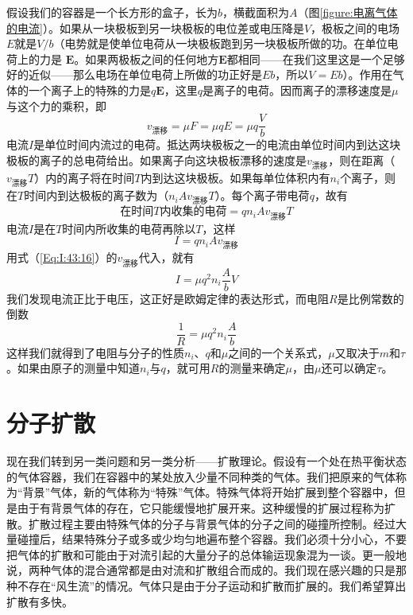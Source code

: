 假设我们的容器是一个长方形的盒子，长为$b$，横截面积为$A$（图\ref{figure:电离气体的电流}）。如果从一块极板到另一块极板的电位差或电压降是$V$，极板之间的电场$E$就是$V /b$（电势就是使单位电荷从一块极板跑到另一块极板所做的功。在单位电荷上的力是 $\boldsymbol{E}$。如果两极板之间的任何地方$\boldsymbol{E}$都相同——在我们这里这是一个足够好的近似——那么电场在单位电荷上所做的功正好是$Eb$，所以$V=Eb$）。作用在气体的一个离子上的特殊的力是$q\boldsymbol{E}$，这里$q$是离子的电荷。因而离子的漂移速度是$\mu$与这个力的乘积，即
\begin{equation}
    \label{Eq:I:43:16}
    v_\text{漂移}=\mu F = \mu qE = \mu q \frac{V}{b}
\end{equation}
电流$I$是单位时间内流过的电荷。抵达两块极板之一的电流由单位时间内到达这块极板的离子的总电荷给出。如果离子向这块极板漂移的速度是$v_\text{漂移}$，则在距离（$v_\text{漂移} T$）内的离子将在时间$T$内到达这块极板。如果每单位体积内有$n_i$个离子，则在$T$时间内到达极板的离子数为（$n_i Av_\text{漂移}T$）。每个离子带电荷$q$，故有
\begin{equation}
    \label{Eq:I:43:17}
    \text{在时间$T$内收集的电荷} = qn_iAv_\text{漂移}T
\end{equation}
电流$I$是在$T$时间内所收集的电荷再除以$T$，这样
\begin{equation}
    \label{Eq:I:43:18}
    I = qn_iAv_\text{漂移}
\end{equation}
用式（\ref{Eq:I:43:16}）的$v_\text{漂移}$代入，就有
\begin{equation}
    \label{Eq:I:43:19}
    I = \mu q^2n_i\frac{A}{b}V
\end{equation}
我们发现电流正比于电压，这正好是欧姆定律的表达形式，而电阻$R$是比例常数的倒数
\begin{equation}
    \label{Eq:I:43:20}
    \frac{1}{R} = \mu q^2n_i\frac{A}{b}
\end{equation}
这样我们就得到了电阻与分子的性质$n_i$、$q$和$\mu$之间的一个关系式，$\mu$又取决于$m$和$\tau$。如果由原子的测量中知道$n_i$与$q$，就可用$R$的测量来确定$\mu$，由$\mu$还可以确定$\tau$。

\section{分子扩散}

现在我们转到另一类问题和另一类分析——扩散理论。假设有一个处在热平衡状态的气体容器，我们在容器中的某处放入少量不同种类的气体。我们把原来的气体称为“背景”气体，新的气体称为“特殊”气体。特殊气体将开始扩展到整个容器中，但是由于有背景气体的存在，它只能缓慢地扩展开来。这种缓慢的扩展过程称为扩散。扩散过程主要由特殊气体的分子与背景气体的分子之间的碰撞所控制。经过大量碰撞后，结果特殊分子或多或少均匀地遍布整个容器。我们必须十分小心，不要把气体的扩散和可能由于对流引起的大量分子的总体输运现象混为一谈。更一般地说，两种气体的混合通常都是由对流和扩散组合而成的。我们现在感兴趣的只是那种不存在“风生流”的情况。气体只是由于分子运动和扩散而扩展的。我们希望算出扩散有多快。

